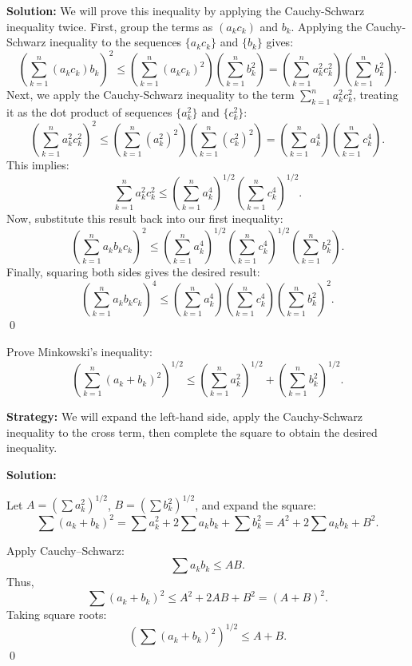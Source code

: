\bigskip\noindent\textbf{Solution:}
We will prove this inequality by applying the Cauchy-Schwarz inequality twice.
First, group the terms as $(a_k c_k)$ and $b_k$. Applying the Cauchy-Schwarz inequality to the sequences $\{a_k c_k\}$ and $\{b_k\}$ gives:
\[
\left( \sum_{k=1}^n (a_k c_k) b_k \right)^2 \leq \left( \sum_{k=1}^n (a_k c_k)^2 \right) \left( \sum_{k=1}^n b_k^2 \right) = \left( \sum_{k=1}^n a_k^2 c_k^2 \right) \left( \sum_{k=1}^n b_k^2 \right).
\]
Next, we apply the Cauchy-Schwarz inequality to the term $\sum_{k=1}^n a_k^2 c_k^2$, treating it as the dot product of sequences $\{a_k^2\}$ and $\{c_k^2\}$:
\[
\left( \sum_{k=1}^n a_k^2 c_k^2 \right)^2 \leq \left( \sum_{k=1}^n (a_k^2)^2 \right) \left( \sum_{k=1}^n (c_k^2)^2 \right) = \left( \sum_{k=1}^n a_k^4 \right) \left( \sum_{k=1}^n c_k^4 \right).
\]
This implies:
\[
\sum_{k=1}^n a_k^2 c_k^2 \leq \left( \sum_{k=1}^n a_k^4 \right)^{1/2} \left( \sum_{k=1}^n c_k^4 \right)^{1/2}.
\]
Now, substitute this result back into our first inequality:
\[
\left( \sum_{k=1}^n a_k b_k c_k \right)^2 \leq \left( \sum_{k=1}^n a_k^4 \right)^{1/2} \left( \sum_{k=1}^n c_k^4 \right)^{1/2} \left( \sum_{k=1}^n b_k^2 \right).
\]
Finally, squaring both sides gives the desired result:
\[
\left( \sum_{k=1}^n a_k b_k c_k \right)^4 \leq \left( \sum_{k=1}^n a_k^4 \right) \left( \sum_{k=1}^n c_k^4 \right) \left( \sum_{k=1}^n b_k^2 \right)^2.
\]\qed


\begin{problembox}
\begin{problemstatement}
Prove Minkowski's inequality:
\[
\left( \sum_{k=1}^n (a_k + b_k)^2 \right)^{1/2} \leq \left( \sum_{k=1}^n a_k^2 \right)^{1/2} + \left( \sum_{k=1}^n b_k^2 \right)^{1/2}.
\]
\end{problemstatement}
\end{problembox}

\noindent\textbf{Strategy:} We will expand the left-hand side, apply the Cauchy-Schwarz inequality to the cross term, then complete the square to obtain the desired inequality.

\bigskip\noindent\textbf{Solution:}

Let \( A = \left( \sum a_k^2 \right)^{1/2} \), \( B = \left( \sum b_k^2 \right)^{1/2} \), and expand the square:
\[
\sum (a_k + b_k)^2 = \sum a_k^2 + 2\sum a_k b_k + \sum b_k^2 = A^2 + 2\sum a_k b_k + B^2.
\]

Apply Cauchy–Schwarz:
\[
\sum a_k b_k \leq A B.
\]
Thus,
\[
\sum (a_k + b_k)^2 \leq A^2 + 2AB + B^2 = (A + B)^2.
\]
Taking square roots:
\[
\left( \sum (a_k + b_k)^2 \right)^{1/2} \leq A + B.
\]\qed


